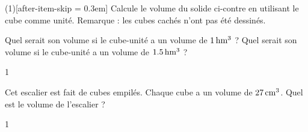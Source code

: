 \documentclass[a4paper,11pt]{report}
\begin{document}
\begin{exo}{
		\begin{minipage}[t]{0.6\textwidth}{
		\vspace{0pt}
	\begin{tasks}(1)[after-item-skip = 0.3em]
    \task Calcule le volume du solide ci-contre en utilisant le cube comme unité. Remarque : les cubes cachés n'ont pas été dessinés. 	
\end{tasks}
		}
		\end{minipage}
		\begin{minipage}[t]{0.4\textwidth}{
		\vspace{0pt}
\begin{center}
\end{center}
		}
		\end{minipage}


		\begin{tasks}[after-item-skip = 0.3em]
			\task[b)] Quel serait  son volume si le cube-unité a un volume de $\tunit{1}{\hecto m^3}$ ? 
			\task[c)] Quel serait  son volume si le cube-unité a un volume de $\tunit{1,5}{\hecto m^3}$ ? 
\end{tasks}
}{1}
\end{exo}


\begin{exo}{
		\begin{minipage}[t]{0.6\textwidth}{
		\vspace{0pt}
		Cet escalier est fait de cubes empilés. Chaque cube a un volume de $27\,\mathrm{cm^3}$. Quel est le volume de l'escalier ?
		}
		\end{minipage}
		\begin{minipage}[t]{0.4\textwidth}{
		\vspace{0pt}
\begin{center}
\end{center}		}
		\end{minipage}
}{1}
\end{exo}
\end{document}
